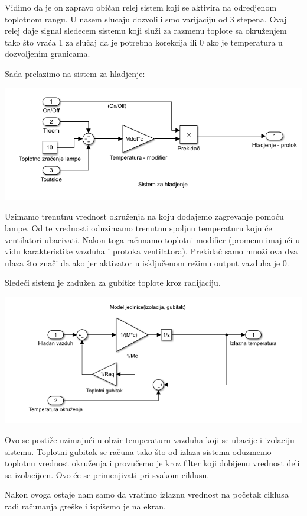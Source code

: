 \documentclass[a4paper,11pt]{book}
\begin{document}
Vidimo da je on zapravo običan relej sistem koji se aktivira na odredjenom toplotnom rangu. U nasem slucaju dozvolili smo varijaciju od 3 stepena. Ovaj relej daje signal sledecem sistemu koji služi za razmenu toplote sa okruženjem tako što vraća 1 za slučaj da je potrebna korekcija ili 0 ako je temperatura u dozvoljenim granicama.

Sada prelazimo na sistem za hladjenje:

\includegraphics[width=\textwidth]{vent.png}

Uzimamo trenutnu vrednost okruženja na koju dodajemo zagrevanje pomoću lampe. Od te vrednosti oduzimamo trenutnu spoljnu temperaturu koju će ventilatori ubacivati. Nakon toga računamo toplotni modifier (promenu imajući u vidu karakteristike vazduha i protoka ventilatora). Prekidač samo množi ova dva ulaza što znači da ako jer aktivator u isključenom režimu output vazduha je 0.

Sledeći sistem je zadužen za gubitke toplote kroz radijaciju.

\includegraphics[width=\textwidth]{haus.png}

Ovo se postiže uzimajući u obzir temperaturu vazduha koji se ubacije i izolaciju sistema. Toplotni gubitak se računa tako što od izlaza sistema oduzmemo toplotnu vrednost okruženja i provučemo je kroz filter koji dobijenu vrednost deli sa izolacijom. Ovo će se primenjivati pri svakom ciklusu.

Nakon ovoga ostaje nam samo da vratimo izlaznu vrednost na početak ciklusa radi računanja greške i ispišemo je na ekran.
\end{document}
